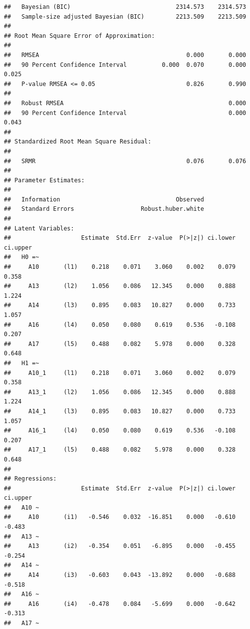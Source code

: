 \documentclass[]{article}
\begin{document}
\begin{verbatim}
##   Bayesian (BIC)                              2314.573    2314.573
##   Sample-size adjusted Bayesian (BIC)         2213.509    2213.509
## 
## Root Mean Square Error of Approximation:
## 
##   RMSEA                                          0.000       0.000
##   90 Percent Confidence Interval          0.000  0.070       0.000  0.025
##   P-value RMSEA <= 0.05                          0.826       0.990
## 
##   Robust RMSEA                                               0.000
##   90 Percent Confidence Interval                             0.000  0.043
## 
## Standardized Root Mean Square Residual:
## 
##   SRMR                                           0.076       0.076
## 
## Parameter Estimates:
## 
##   Information                                 Observed
##   Standard Errors                   Robust.huber.white
## 
## Latent Variables:
##                    Estimate  Std.Err  z-value  P(>|z|) ci.lower ci.upper
##   H0 =~                                                                 
##     A10       (l1)    0.218    0.071    3.060    0.002    0.079    0.358
##     A13       (l2)    1.056    0.086   12.345    0.000    0.888    1.224
##     A14       (l3)    0.895    0.083   10.827    0.000    0.733    1.057
##     A16       (l4)    0.050    0.080    0.619    0.536   -0.108    0.207
##     A17       (l5)    0.488    0.082    5.978    0.000    0.328    0.648
##   H1 =~                                                                 
##     A10_1     (l1)    0.218    0.071    3.060    0.002    0.079    0.358
##     A13_1     (l2)    1.056    0.086   12.345    0.000    0.888    1.224
##     A14_1     (l3)    0.895    0.083   10.827    0.000    0.733    1.057
##     A16_1     (l4)    0.050    0.080    0.619    0.536   -0.108    0.207
##     A17_1     (l5)    0.488    0.082    5.978    0.000    0.328    0.648
## 
## Regressions:
##                    Estimate  Std.Err  z-value  P(>|z|) ci.lower ci.upper
##   A10 ~                                                                 
##     A10       (i1)   -0.546    0.032  -16.851    0.000   -0.610   -0.483
##   A13 ~                                                                 
##     A13       (i2)   -0.354    0.051   -6.895    0.000   -0.455   -0.254
##   A14 ~                                                                 
##     A14       (i3)   -0.603    0.043  -13.892    0.000   -0.688   -0.518
##   A16 ~                                                                 
##     A16       (i4)   -0.478    0.084   -5.699    0.000   -0.642   -0.313
##   A17 ~                                                                 

\end{verbatim}
\end{document}

